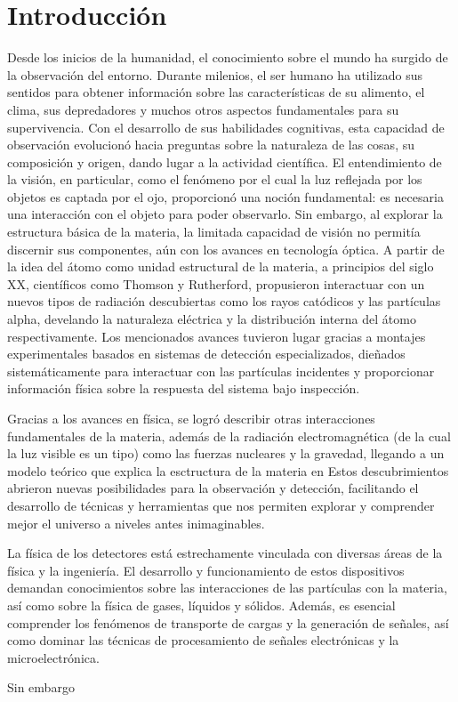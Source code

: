 \documentclass[]{book}
\begin{document}
\chapter{Introducción}
Desde los inicios de la humanidad, el conocimiento sobre el mundo ha surgido de la observación del entorno. 
Durante milenios, el ser humano ha utilizado sus sentidos para obtener información sobre las características 
de su alimento, el clima, sus depredadores y muchos otros aspectos fundamentales para su supervivencia. 
Con el desarrollo de sus habilidades cognitivas, esta capacidad de observación evolucionó hacia preguntas
sobre la naturaleza de las cosas, su composición y origen, dando lugar a la actividad científica.
El entendimiento de la visión, en particular, como el fenómeno por el cual la luz reflejada por los objetos 
es captada por el ojo, proporcionó una noción fundamental: es necesaria una interacción con el objeto para 
poder observarlo. Sin embargo, al explorar la estructura básica de la materia, la limitada capacidad de visión no 
permitía discernir sus componentes, aún con los avances en tecnología óptica. A partir de la idea del átomo como unidad estructural de la materia, a principios del siglo XX, científicos como Thomson y Rutherford, propusieron interactuar con un nuevos tipos de radiación descubiertas como los rayos catódicos y las partículas alpha, develando la naturaleza eléctrica y la distribución interna del átomo respectivamente. Los mencionados avances tuvieron lugar gracias a montajes experimentales basados en sistemas de detección especializados, dieñados sistemáticamente para interactuar con las partículas incidentes y proporcionar información física sobre la respuesta del sistema bajo inspección.


Gracias a los avances en física, se logró describir otras interacciones fundamentales de la materia, además 
de la radiación electromagnética (de la cual la luz visible es un tipo) como las fuerzas nucleares y la gravedad, llegando a un modelo teórico que explica la esctructura de la materia en  
Estos descubrimientos abrieron nuevas posibilidades para la observación y detección, facilitando el desarrollo de técnicas y herramientas que nos permiten explorar y comprender mejor el universo a niveles antes inimaginables.

La física de los detectores está estrechamente vinculada con diversas áreas de la física y la ingeniería. 
El desarrollo y funcionamiento de estos dispositivos demandan conocimientos sobre las interacciones de las 
partículas con la materia, así como sobre la física de gases, líquidos y sólidos. Además, es esencial comprender 
los fenómenos de transporte de cargas y la generación de señales, así como dominar las técnicas de procesamiento 
de señales electrónicas y la microelectrónica.

Sin embargo
\end{document}
